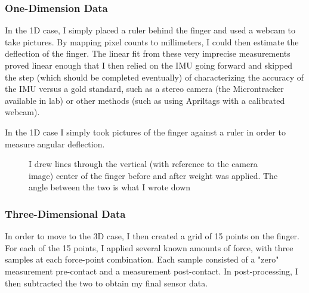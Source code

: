 \documentclass[preprint,12pt,3p]{elsarticle}
\begin{document}
\subsubsection{One-Dimension Data}
In the 1D case, I simply placed a ruler behind the finger and used a webcam to take
pictures. By mapping pixel counts to millimeters, I could then estimate the deflection of the
finger. The linear fit from these very imprecise measurements proved linear enough that I then
relied on the IMU going forward and skipped the step (which should be completed eventually) of
characterizing the accuracy of the IMU versus a gold standard, such as a stereo camera (the
Microntracker available in lab) or other methods (such as using Apriltags with a calibrated webcam). 

In the 1D case I simply took pictures of the finger against a ruler in order to measure angular deflection. 

\begin{figure}[htbp]
    \centering 
        \hfil %
        \hfil
        \caption{I drew lines through the vertical (with reference to the camera image) center of
            the finger before and after weight was applied. The angle between the two is what I
        wrote down}
    \label{fig:myfig}
\end{figure}

\subsubsection{Three-Dimensional Data}
In order to move to the 3D case, I then created a grid of 15 points on the finger. For each of the
15 points, I applied several known amounts of force, with three samples at each force-point
combination. Each sample consisted of a "zero" measurement pre-contact and a
measurement post-contact. In post-processing, I then subtracted the two to
obtain my final sensor data.
\end{document}
